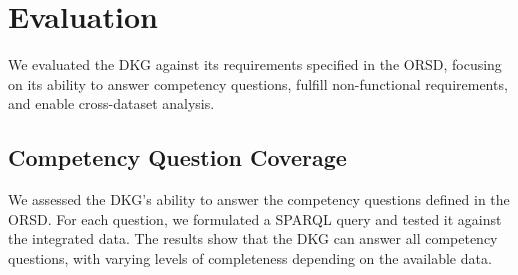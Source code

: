 \documentclass[runningheads]{llncs}  %
\begin{document}
\begin{comment}
\subsection{Query Examples}
The integrated European Parliament debate data can be queried using SPARQL. Here are some example queries:

\begin{lstlisting}[language=sql,caption=SPARQL query for contributions by a participant]
PREFIX dkg: <https://w3id.org/deliberation/ontology#>
PREFIX rdf: <http://www.w3.org/1999/02/22-rdf-syntax-ns#>

SELECT ?timestamp ?text
WHERE {
  ?participant rdf:type dkg:Participant ;
              dkg:name ?name ;
              ^dkg:madeBy ?contribution .
  ?contribution dkg:timestamp ?timestamp ;
               dkg:text ?text .
  FILTER(REGEX(?name, "President", "i"))
}
ORDER BY ?timestamp
\end{lstlisting}

\begin{lstlisting}[language=sql,caption=SPARQL query for contributions on a specific topic]
PREFIX dkg: <https://w3id.org/deliberation/ontology#>
PREFIX rdf: <http://www.w3.org/1999/02/22-rdf-syntax-ns#>

SELECT ?topic_name ?participant_name ?timestamp ?text
WHERE {
  ?topic rdf:type dkg:Topic ;
        dkg:name ?topic_name .
  ?process dkg:hasTopic ?topic ;
          dkg:hasContribution ?contribution .
  ?contribution dkg:timestamp ?timestamp ;
               dkg:text ?text ;
               dkg:madeBy ?participant .
  ?participant dkg:name ?participant_name .
  FILTER(REGEX(?text, "Belarus", "i"))
}
ORDER BY ?timestamp
\end{lstlisting}

These queries demonstrate the analytical capabilities enabled by the DKG integration of European Parliament debates.
\end{comment}

\section{Evaluation}
We evaluated the DKG against its requirements specified in the ORSD, focusing on its ability to answer competency questions, fulfill non-functional requirements, and enable cross-dataset analysis.

\subsection{Competency Question Coverage}
We assessed the DKG's ability to answer the competency questions defined in the ORSD. For each question, we formulated a SPARQL query and tested it against the integrated data. The results show that the DKG can answer all competency questions, with varying levels of completeness depending on the available data.
\end{document}
